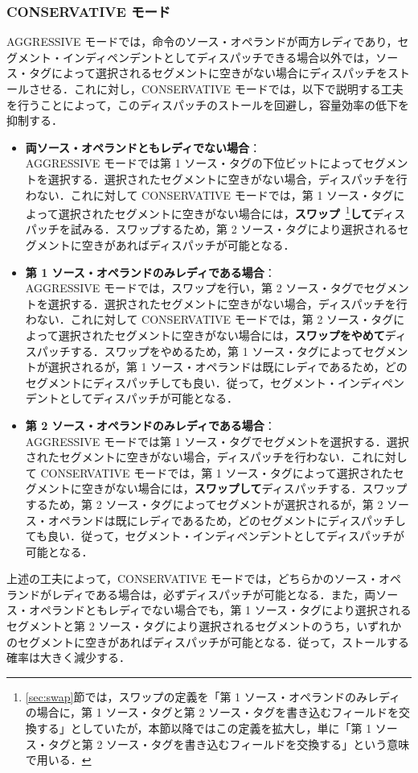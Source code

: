 \subsubsection{CONSERVATIVE モード}
AGGRESSIVE モードでは，命令のソース・オペランドが両方レディであり，セグメント・インディペンデントとしてディスパッチできる場合以外では，ソース・タグによって選択されるセグメントに空きがない場合にディスパッチをストールさせる．これに対し，CONSERVATIVE モードでは，以下で説明する工夫を行うことによって，このディスパッチのストールを回避し，容量効率の低下を抑制する．
\begin{itemize}
  \item \textbf{両ソース・オペランドともレディでない場合}：\\AGGRESSIVE モードでは第 1 ソース・タグの下位ビットによってセグメントを選択する．選択されたセグメントに空きがない場合，ディスパッチを行わない．これに対して CONSERVATIVE モードでは，第 1 ソース・タグによって選択されたセグメントに空きがない場合には，\textbf{スワップ}~\footnote{\ref{sec:swap}節では，スワップの定義を「第 1 ソース・オペランドのみレディの場合に，第 1 ソース・タグと第 2 ソース・タグを書き込むフィールドを交換する」としていたが，本節以降ではこの定義を拡大し，単に「第 1 ソース・タグと第 2 ソース・タグを書き込むフィールドを交換する」という意味で用いる．}\textbf{して}ディスパッチを試みる．スワップするため，第 2 ソース・タグにより選択されるセグメントに空きがあればディスパッチが可能となる．
  \item \textbf{第 1 ソース・オペランドのみレディである場合}：\\AGGRESSIVE モードでは，スワップを行い，第 2 ソース・タグでセグメントを選択する．選択されたセグメントに空きがない場合，ディスパッチを行わない．これに対して CONSERVATIVE モードでは，第 2 ソース・タグによって選択されたセグメントに空きがない場合には，\textbf{スワップをやめて}ディスパッチする．スワップをやめるため，第 1 ソース・タグによってセグメントが選択されるが，第 1 ソース・オペランドは既にレディであるため，どのセグメントにディスパッチしても良い．従って，セグメント・インディペンデントとしてディスパッチが可能となる．
  \item \textbf{第 2 ソース・オペランドのみレディである場合}：\\AGGRESSIVE モードでは第 1 ソース・タグでセグメントを選択する．選択されたセグメントに空きがない場合，ディスパッチを行わない．これに対して CONSERVATIVE モードでは，第 1 ソース・タグによって選択されたセグメントに空きがない場合には，\textbf{スワップして}ディスパッチする．スワップするため，第 2 ソース・タグによってセグメントが選択されるが，第 2 ソース・オペランドは既にレディであるため，どのセグメントにディスパッチしても良い．従って，セグメント・インディペンデントとしてディスパッチが可能となる．
\end{itemize}
上述の工夫によって，CONSERVATIVE モードでは，どちらかのソース・オペランドがレディである場合は，必ずディスパッチが可能となる．また，両ソース・オペランドともレディでない場合でも，第 1 ソース・タグにより選択されるセグメントと第 2 ソース・タグにより選択されるセグメントのうち，いずれかのセグメントに空きがあればディスパッチが可能となる．従って，ストールする確率は大きく減少する．

